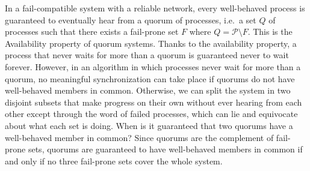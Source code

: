 \documentclass[11pt,letterpaper]{article}
\begin{document}
In a fail-compatible system with a reliable network, every well-behaved process is guaranteed to eventually hear from a quorum of processes, i.e.\ a set $Q$ of processes such that there exists a fail-prone set $F$ where $Q=\mathcal{P}\setminus F$.
This is the Availability property of quorum systems.
Thanks to the availability property, a process that never waits for more than a quorum is guaranteed never to wait forever.
However, in an algorithm in which processes never wait for more than a quorum, no meaningful synchronization can take place if quorums do not have well-behaved members in common.
Otherwise, we can split the system in two disjoint subsets that make progress on their own without ever hearing from each other except through the word of failed processes, which can lie and equivocate about what each set is doing.
When is it guaranteed that two quorums have a well-behaved member in common?
Since quorums are the complement of fail-prone sets, quorums are guaranteed to have well-behaved members in common if and only if no three fail-prone sets cover the whole system.
\end{document}
